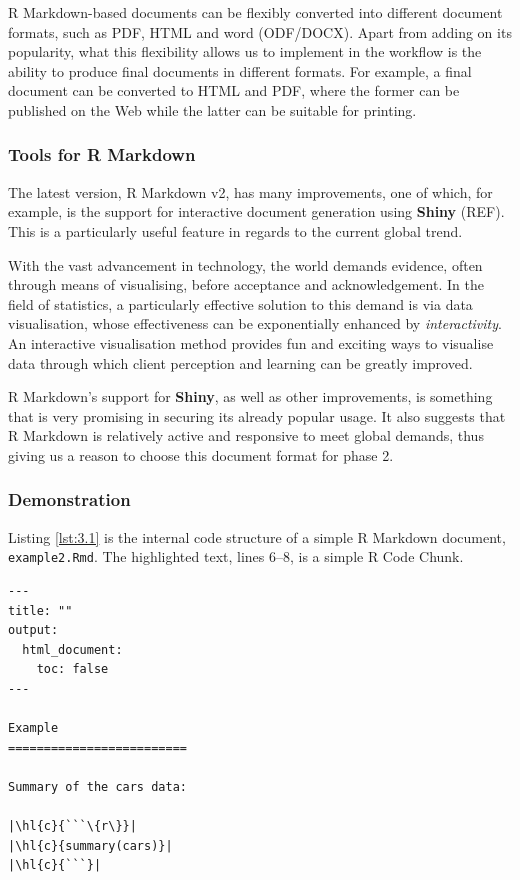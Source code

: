 \documentclass[a4paper, 12pt]{report}
\begin{document}
R Markdown-based documents can be flexibly converted into different document formats, such as PDF, HTML and word (ODF/DOCX). Apart from adding on its popularity, what this flexibility allows us to implement in the workflow is the ability to produce final documents in different formats. For example, a final document can be converted to HTML and PDF, where the former can be published on the Web while the latter can be suitable for printing.


\subsubsection*{Tools for R Markdown}
The latest version, R Markdown v2, has many improvements, one of which, for example, is the support for interactive document generation using \textbf{Shiny} (REF). This is a particularly useful feature in regards to the current global trend.

With the vast advancement in technology, the world demands evidence, often through means of visualising, before acceptance and acknowledgement. In the field of statistics, a particularly effective solution to this demand is via data visualisation, whose effectiveness can be exponentially enhanced by \emph{interactivity}. An interactive visualisation method provides fun and exciting ways to visualise data through which client perception and learning can be greatly improved.

R Markdown's support for \textbf{Shiny}, as well as other improvements, is something that is very promising in securing its already popular usage. It also suggests that R Markdown is relatively active and responsive to meet global demands, thus giving us a reason to choose this document format for phase 2.


\subsubsection*{Demonstration}
Listing \ref{lst:3.1} is the internal code structure of a simple R Markdown document, \texttt{example2.Rmd}. The highlighted text, lines 6--8, is a simple R Code Chunk.

\begin{lstlisting}[caption={\texttt{example2.Rmd}}, escapechar=\|, label={lst:3.1}]
---
title: ""
output:
  html_document:
    toc: false
---

Example
=========================

Summary of the cars data:

|\hl{c}{```\{r\}}|
|\hl{c}{summary(cars)}|
|\hl{c}{```}|
\end{lstlisting}
\end{document}
